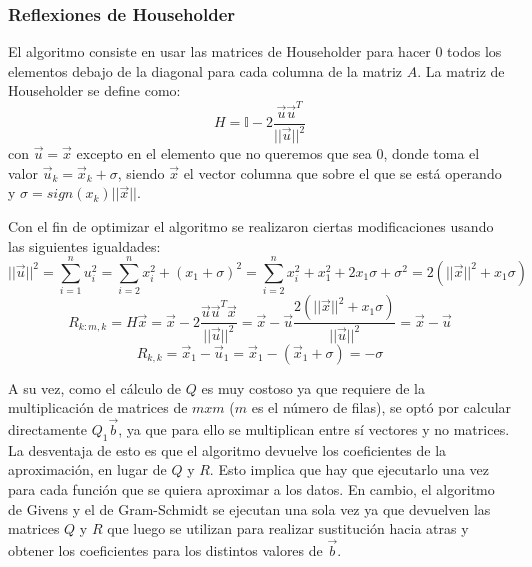 \documentclass[journal, monochrome]{IEEEtran}
\begin{document}
\vspace{0.5cm}
\subsubsection{Reflexiones de Householder}
\par
El algoritmo consiste en usar las matrices de Householder para hacer 0 todos los elementos debajo de la diagonal para cada columna de la matriz $A$. La matriz de Householder se define como:
\begin{equation}
H = \mathbb{I} - 2\frac{\vec{u}\vec{u}^{T}}{||\vec{u}||^{2}}
\label{equation:householder}
\end{equation}
con $\vec{u} = \vec{x}$ excepto en el elemento que no queremos que sea 0, donde toma el valor $\vec{u}_{k} = \vec{x}_{k} + \sigma$, siendo $\vec{x}$ el vector columna que sobre el que se está operando y $\sigma = sign(x_{k})||\vec{x}||$.
\par
Con el fin de optimizar el algoritmo se realizaron ciertas modificaciones usando las siguientes igualdades:
\begin{equation}
||\vec{u}||^{2} = \sum_{i=1}^{n} u_{i}^{2} = \sum_{i=2}^{n} x_{i}^{2} + (x_{1}+\sigma)^{2}
 = \sum_{i=2}^{n} x_{i}^{2} + x_{1}^{2} + 2x_{1}\sigma + \sigma^{2} = 2(||\vec{x}||^{2} + x_{1}\sigma)
\end{equation}
\begin{equation}
R_{k:m,k} = H\vec{x} = \vec{x} - 2\frac{\vec{u}\vec{u}^{T}\vec{x}}{||\vec{u}||^{2}} = \vec{x} - \vec{u}\frac{2(||\vec{x}||^{2}+x_{1}\sigma)}{||\vec{u}||^{2}} = \vec{x} - \vec{u}
\end{equation}
\begin{equation}
R_{k,k} = \vec{x}_{1} - \vec{u}_{1} = \vec{x}_{1} - (\vec{x}_{1} + \sigma) = -\sigma
\end{equation}
\par
A su vez, como el cálculo de $Q$ es muy costoso ya que requiere de la multiplicación de matrices de $mxm$ ($m$ es el número de filas), se optó por calcular directamente $Q_{1}\vec{b}$, ya que para ello se multiplican entre sí vectores y no matrices. La desventaja de esto es que el algoritmo devuelve los coeficientes de la aproximación, en lugar de $Q$ y $R$. Esto implica que hay que ejecutarlo una vez para cada función que se quiera aproximar a los datos. En cambio, el algoritmo de Givens y el de Gram-Schmidt se ejecutan una sola vez ya que devuelven las matrices $Q$ y $R$ que luego se utilizan para realizar sustitución hacia atras y obtener los coeficientes para los distintos valores de $\vec{b}$.
\end{document}
